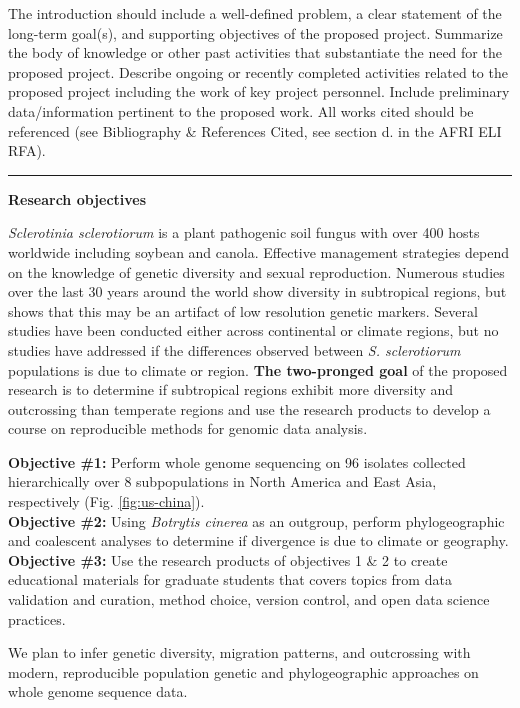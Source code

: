 \documentclass[12pt,letterpaper]{article}
\begin{document}
The introduction should include a well-defined problem, a clear statement of
the long-term goal(s), and supporting objectives of the proposed project.
Summarize the body of knowledge or other past activities that substantiate the
need for the proposed project. Describe ongoing or recently completed
activities related to the proposed project including the work of key project
personnel. Include preliminary data/information pertinent to the proposed
work. All works cited should be referenced (see Bibliography \& References
Cited, see section d. in the AFRI ELI RFA).\\
\rule{\textwidth}{0.5pt}

\noindent \textbf{Research objectives}

\textit{Sclerotinia sclerotiorum} is a plant pathogenic soil fungus with over 400 hosts worldwide including soybean and canola. 
Effective management strategies depend on the knowledge of genetic diversity and sexual reproduction.
Numerous studies over the last 30 years around the world show diversity in subtropical regions, but \cite{lehner2017sclerotinia} shows that this may be an artifact of low resolution genetic markers.
Several studies have been conducted either across continental or climate regions, but no studies have addressed if the differences observed between \textit{S. sclerotiorum} populations is due to climate or region. 
\textbf{The two-pronged goal} of the proposed research is to determine if subtropical regions exhibit more diversity and outcrossing than temperate regions and use the research products to develop a course on reproducible methods for genomic data analysis.

\noindent
\textbf{Objective \#1:} Perform whole genome sequencing on 96 isolates collected hierarchically over 8 subpopulations in North America and East Asia, respectively (Fig. \ref{fig:us-china}).\\
\textbf{Objective \#2:} Using \textit{Botrytis cinerea} as an outgroup, perform phylogeographic and coalescent analyses to determine if divergence is due to climate or geography.\\
\textbf{Objective \#3:} Use the research products of objectives 1 \& 2 to create educational materials for graduate students that covers topics from
data validation and curation, method choice, version control, and open data science practices.

We plan to infer genetic diversity, migration patterns, and outcrossing with modern, reproducible population genetic and phylogeographic approaches on whole genome sequence data. 
\end{document}
